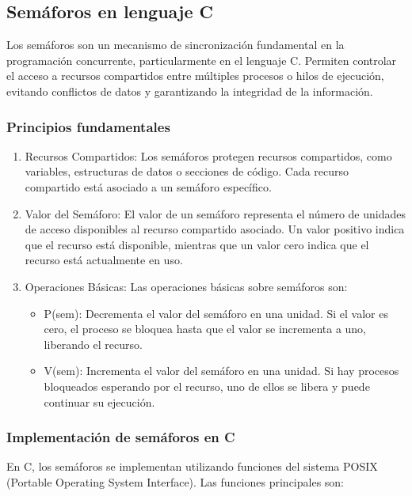 \subsection{Semáforos en lenguaje C}

Los semáforos son un mecanismo de sincronización fundamental en la programación concurrente, particularmente en el lenguaje C. Permiten controlar el acceso a recursos compartidos entre múltiples procesos o hilos de ejecución, evitando conflictos de datos y garantizando la integridad de la información.

\subsubsection{Principios fundamentales}

\begin{enumerate}
	\def\labelenumi{\arabic{enumi}.}
	\item   Recursos Compartidos: Los semáforos protegen recursos compartidos,   como variables, estructuras de datos o secciones de código. Cada   recurso compartido está asociado a un semáforo específico.
	\item   Valor del Semáforo: El valor de un semáforo representa el número de   unidades de acceso disponibles al recurso compartido asociado. Un   valor positivo indica que el recurso está disponible, mientras que un   valor cero indica que el recurso está actualmente en uso.
	\item   Operaciones Básicas: Las operaciones básicas sobre semáforos son:
	\begin{itemize}
		\item P(sem): Decrementa el valor del semáforo en una unidad. Si el valor     es cero, el proceso se bloquea hasta que el valor se incrementa a     uno, liberando el recurso.
		\item     V(sem): Incrementa el valor del semáforo en una unidad. Si hay     procesos bloqueados esperando por el recurso, uno de ellos se libera     y puede continuar su ejecución.
	\end{itemize}
\end{enumerate}

\subsubsection{Implementación de semáforos en C}

En C, los semáforos se implementan utilizando funciones del sistema POSIX (Portable Operating System Interface). Las funciones principales son:

